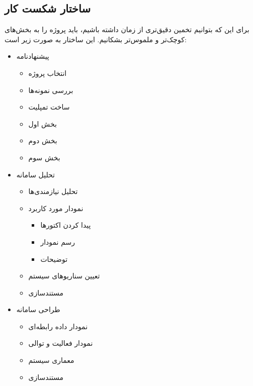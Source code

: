 \subsection{ساختار شکست کار
}
برای این که بتوانیم تخمین دقیق‌تری از زمان داشته باشیم، باید پروژه را به بخش‌های کوچک‌تر و ملموس‌تر بشکانیم. این ساختار به صورت زیر است:
\begin{itemize}
	\item 
	پیشنهادنامه
	\begin{itemize}
		\item 
		انتخاب پروژه
		\item
		بررسی نمونه‌ها
		\item
		ساخت تمپلیت
		\item
		بخش اول
		\item
		بخش دوم
		\item
		بخش سوم
	\end{itemize}
	\item 
	تحلیل سامانه
	\begin{itemize}
		\item 
		تحلیل نیازمندی‌ها
		\item
		نمودار مورد کاربرد
		\begin{itemize}
			\item 
			پیدا کردن اکتورها
			\item 
			رسم نمودار
			\item 
			توضیحات
		\end{itemize}
		\item
		تعیین سناریوهای سیستم
		\item
		مستندسازی
	\end{itemize}
	\item 
	طراحی سامانه
	\begin{itemize}
		\item 
		نمودار داده رابطه‌ای
		\item 
		نمودار فعالیت و توالی
		\item 
		معماری سیستم
		\item 
		مستندسازی
		

\end{itemize}
\end{itemize}
